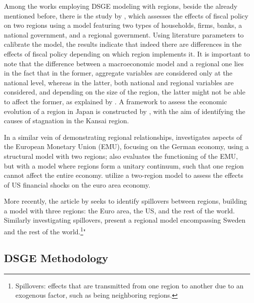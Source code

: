 \documentclass[../thesis.tex]{subfiles}
\begin{document}

Among the works employing DSGE modeling with regions, beside the already mentioned before, there is the study by \textcite{tamegawa_two-region_2012}, which assesses the effects of fiscal policy on two regions using a model featuring two types of households, firms, banks, a national government, and a regional government. Using literature parameters to calibrate the model, the results indicate that indeed there are differences in the effects of fiscal policy depending on which region implements it. It is important to note that the difference between a macroeconomic model and a regional one lies in the fact that in the former, aggregate variables are considered only at the national level, whereas in the latter, both national and regional variables are considered, and depending on the size of the region, the latter might not be able to affect the former, as explained by \textcite{tamegawa_constructing_2013}. 	A framework to assess the economic evolution of a region in Japan is constructed by \textcite{okano_development_2015}, with the aim of identifying the causes of stagnation in the Kansai region.

In a similar vein of demonstrating regional relationships, \textcite{pytlarczyk_estimated_2005} investigates aspects of the European Monetary Union (EMU), focusing on the German economy, using a structural model with two regions; \textcite{gali_optimal_2005} also evaluates the functioning of the EMU, but with a model where regions form a unitary continuum, such that one region cannot affect the entire economy. \textcite{alpanda_international_2014} utilize a two-region model to assess the effects of US financial shocks on the euro area economy.

More recently, the article by \textcite{croitorov_financial_2020} seeks to identify spillovers between regions, building a model with three regions: the Euro area, the US, and the rest of the world. Similarly investigating spillovers, \textcite{corbo_maja_2020} present a regional model encompassing Sweden and the rest of the world.\footnote{ Spillovers: effects that are transmitted from one region to another due to an exogenous factor, such as being neighboring regions.}"

\subsection*{DSGE Methodology}
\end{document}
